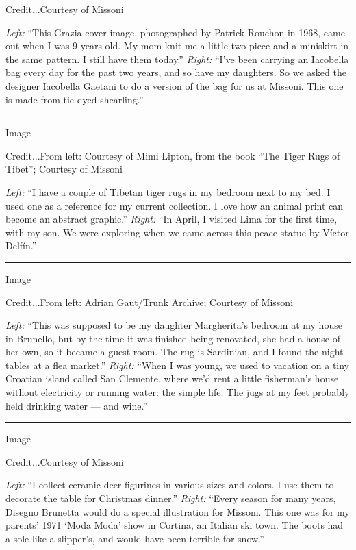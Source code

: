 Credit...Courtesy of Missoni

\emph{Left:} ``This Grazia cover image, photographed by Patrick Rouchon
in 1968, came out when I was 9 years old. My mom knit me a little
two-piece and a miniskirt in the same pattern. I still have them
today.'' \emph{Right:} ``I've been carrying an
\href{https://www.iacobella.com/about-1/}{Iacobella bag} every day for
the past two years, and so have my daughters. So we asked the designer
Iacobella Gaetani to do a version of the bag for us at Missoni. This one
is made from tie-dyed shearling.''

\begin{center}\rule{0.5\linewidth}{\linethickness}\end{center}

Image

Credit...From left: Courtesy of Mimi Lipton, from the book ``The Tiger
Rugs of Tibet''; Courtesy of Missoni

\emph{Left:} ``I have a couple of Tibetan tiger rugs in my bedroom next
to my bed. I used one as a reference for my current collection. I love
how an animal print can become an abstract graphic.'' \emph{Right:} ``In
April, I visited Lima for the first time, with my son. We were exploring
when we came across this peace statue by Víctor Delfín.''

\begin{center}\rule{0.5\linewidth}{\linethickness}\end{center}

Image

Credit...From left: Adrian Gaut/Trunk Archive; Courtesy of Missoni

\emph{Left:} ``This was supposed to be my daughter Margherita's bedroom
at my house in Brunello, but by the time it was finished being
renovated, she had a house of her own, so it became a guest room. The
rug is Sardinian, and I found the night tables at a flea market.''
\emph{Right:} ``When I was young, we used to vacation on a tiny Croatian
island called San Clemente, where we'd rent a little fisherman's house
without electricity or running water: the simple life. The jugs at my
feet probably held drinking water --- and wine.''

\begin{center}\rule{0.5\linewidth}{\linethickness}\end{center}

Image

Credit...Courtesy of Missoni

\emph{Left:} ``I collect ceramic deer figurines in various sizes and
colors. I use them to decorate the table for Christmas dinner.''
\emph{Right:} ``Every season for many years, Disegno Brunetta would do a
special illustration for Missoni. This one was for my parents' 1971
`Moda Moda' show in Cortina, an Italian ski town. The boots had a sole
like a slipper's, and would have been terrible for snow.''

